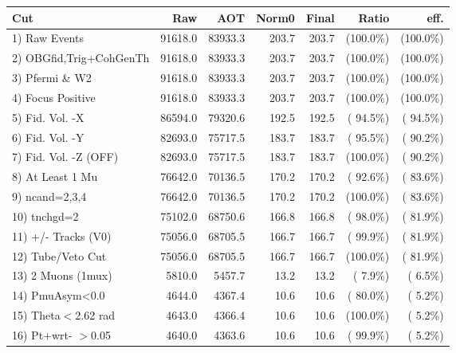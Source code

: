 \begin{table}[h!]\centering
 \begin{tabular}{||l||r|r|r|r|r|r||}
 \hline
 \hline
 Cut & Raw & AOT & Norm0 & Final & Ratio & eff.       \\
 \hline
  1) Raw Events           &      91618.0 &      83933.3 &        203.7 &        203.7 & (100.0\%) & (100.0\%) \\
  2) OBGfid,Trig+CohGenTh &      91618.0 &      83933.3 &        203.7 &        203.7 & (100.0\%) & (100.0\%) \\
  3) Pfermi \& W2         &      91618.0 &      83933.3 &        203.7 &        203.7 & (100.0\%) & (100.0\%) \\
  4) Focus Positive       &      91618.0 &      83933.3 &        203.7 &        203.7 & (100.0\%) & (100.0\%) \\
  5) Fid. Vol. -X         &      86594.0 &      79320.6 &        192.5 &        192.5 & ( 94.5\%) & ( 94.5\%) \\
  6) Fid. Vol. -Y         &      82693.0 &      75717.5 &        183.7 &        183.7 & ( 95.5\%) & ( 90.2\%) \\
  7) Fid. Vol. -Z (OFF)   &      82693.0 &      75717.5 &        183.7 &        183.7 & (100.0\%) & ( 90.2\%) \\
  8) At Least 1 Mu        &      76642.0 &      70136.5 &        170.2 &        170.2 & ( 92.6\%) & ( 83.6\%) \\
  9) ncand=2,3,4          &      76642.0 &      70136.5 &        170.2 &        170.2 & (100.0\%) & ( 83.6\%) \\
 10) tnchgd=2             &      75102.0 &      68750.6 &        166.8 &        166.8 & ( 98.0\%) & ( 81.9\%) \\
 11) +/- Tracks (V0)      &      75056.0 &      68705.5 &        166.7 &        166.7 & ( 99.9\%) & ( 81.9\%) \\
 12) Tube/Veto Cut        &      75056.0 &      68705.5 &        166.7 &        166.7 & (100.0\%) & ( 81.9\%) \\
 13) 2 Muons (1mux)       &       5810.0 &       5457.7 &         13.2 &         13.2 & (  7.9\%) & (  6.5\%) \\
 14) PmuAsym<0.0          &       4644.0 &       4367.4 &         10.6 &         10.6 & ( 80.0\%) & (  5.2\%) \\
 15) Theta$<$2.62 rad     &       4643.0 &       4366.4 &         10.6 &         10.6 & (100.0\%) & (  5.2\%) \\
 16) Pt+wrt- $>$0.05      &       4640.0 &       4363.6 &         10.6 &         10.6 & ( 99.9\%) & (  5.2\%) \\

\end{tabular}
\end{table}
